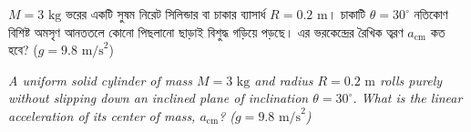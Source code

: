 \documentclass[12pt, a4paper]{article}
\begin{document}
\newpage

\begin{tcolorbox}[questionbox={প্রশ্ন (Question) 2}]
    \noindent
    $M = 3\text{ kg}$ ভরের একটি সুষম নিরেট সিলিন্ডার বা চাকার ব্যাসার্ধ $R = 0.2\text{ m}$। চাকাটি $\theta = 30^\circ$ নতিকোণ বিশিষ্ট অমসৃণ আনততলে কোনো পিছলানো ছাড়াই বিশুদ্ধ গড়িয়ে পড়ছে। এর ভরকেন্দ্রের রৈখিক ত্বরণ $a_{\text{cm}}$ কত হবে? ($g = 9.8\text{ m/s}^2$)
    
    \vspace{0.8em}
    \begin{english}
    \noindent\textit{\color{darkgray}
    A uniform solid cylinder of mass $M = 3\text{ kg}$ and radius $R = 0.2\text{ m}$ rolls purely without slipping down an inclined plane of inclination $\theta = 30^\circ$. What is the linear acceleration of its center of mass, $a_{\text{cm}}$? ($g = 9.8\text{ m/s}^2$)
    }
    \end{english}
\end{tcolorbox}
\end{document}
